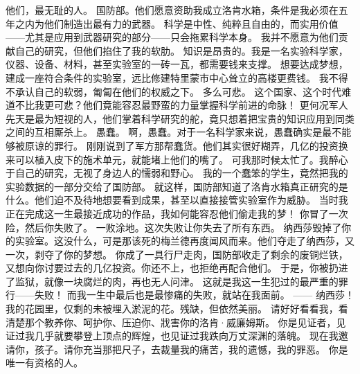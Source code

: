 \documentclass[openany]{book}
\begin{document}
\begin{dialogue}
     他们，最无耻的人。
     国防部。他们愿意资助我成立洛肯水箱，条件是我必须在五年之内为他们制造出最有力的武器。
     科学是中性、纯粹且自由的，而实用价值——尤其是应用到武器研究的部分——只会拖累科学本身。
     我并不愿意为他们贡献自己的研究，但他们掐住了我的软肋。
     知识是昂贵的。我是一名实验科学家，仪器、设备、材料，甚至实验室的一砖一瓦，都需要钱来支撑。
     想要达成梦想，建成一座符合条件的实验室，远比修建特里蒙市中心耸立的高楼更费钱。
     我不得不承认自己的软弱，匍匐在他们的权威之下。
     多么可悲。
     这个国家、这个时代难道不比我更可悲？他们竟能容忍最野蛮的力量掌握科学前进的命脉！
     更何况军人先天是最为短视的人，他们掌着科学研究的舵，竟只想着把宝贵的知识应用到同类之间的互相厮杀上。
     愚蠢。
     啊，愚蠢。对于一名科学家来说，愚蠢确实是最不能够被原谅的罪行。
     刚刚说到了军方那帮蠢货。他们其实很好糊弄，几亿的投资换来可以植入皮下的施术单元，就能堵上他们的嘴了。
     可我那时候太忙了。我醉心于自己的研究，无视了身边人的懦弱和野心。
     我的一个蠢笨的学生，竟然把我的实验数据的一部分交给了国防部。
     就这样，国防部知道了洛肯水箱真正研究的是什么。他们迫不及待地想要看到成果，甚至以直接接管实验室作为威胁。
     当时我正在完成这一生最接近成功的作品，我如何能容忍他们偷走我的梦！
     你冒了一次险，然后你失败了。
     一败涂地。这次失败让你失去了所有东西。
     纳西莎毁掉了你的实验室。这没什么，可是那该死的梅兰德再度闻风而来。他们夺走了纳西莎，又一次，剥夺了你的梦想。
     你成了一具行尸走肉，国防部收走了剩余的废铜烂铁，又想向你讨要过去的几亿投资。你还不上，也拒绝再配合他们。
     于是，你被扔进了监狱，就像一块腐烂的肉，再也无人问津。
     这就是我这一生犯过的最严重的罪行——失败！
     而我一生中最后也是最惨痛的失败，就站在我面前。
     ——
     纳西莎！
     我的花园里，仅剩的未被埋入淤泥的花。残缺，但依然美丽。
     请好好看看我，看清楚那个教养你、呵护你、压迫你、戕害你的洛肯·威廉姆斯。
     你是见证者，见证过我几乎就要攀登上顶点的辉煌，也见证过我跌向万丈深渊的落魄。
     现在我邀请你，孩子。请你充当那把尺子，去裁量我的痛苦，我的遗憾，我的罪恶。
     你是唯一有资格的人。
\end{dialogue}
\end{document}
